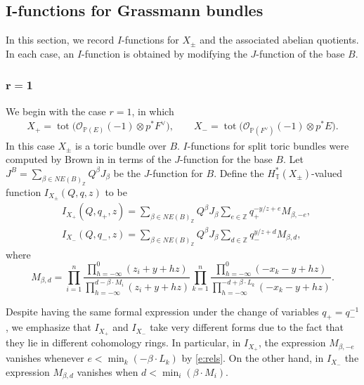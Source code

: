 \documentclass[pdftex]{sigma}
\numberwithin{equation}{section}
\newcommand{\cc}[1]{\mathcal{#1}} %
\newcommand{\ZZ}{\mathbb{Z}}
\newcommand{\PP}{\mathbb{P}}
\newcommand{\torus}{\mathbb{T}}
\DeclareMathOperator{\tot}{tot}
\newcommand{\op}[1]{\operatorname{#1}}
\newcommand{\F}{F}
\newcommand{\E}{E}
\newcommand{\MB}{M}
\newcommand{\LB}{L}
\newcommand{\z}{z}
\newcommand{\x}{x}
\newcommand{\y}{y}
\begin{document}
\subsection[I-functions for Grassmann bundles]{$\boldsymbol{I}$-functions for Grassmann bundles}
In this section, we record $I$-functions for $X_\pm$ and the associated abelian quotients. In each case, an $I$-function is obtained by modifying the $J$-function of the base $B$.

\subsubsection[r=1]{$\boldsymbol{r=1}$}
We begin with the case $r=1$,
in which
\begin{align*}
X_{+} = \tot \bigl( \cc O_{\PP(\E)}(-1) \otimes p^*\F^\vee\bigr),\qquad
X_{-} =\tot \bigl( \cc O_{\PP(\F^\vee)}(-1) \otimes p^*\E\bigr).
\end{align*}
In this case $X_{\pm}$ is a toric bundle over $B$. $I$-functions for split toric bundles were computed by Brown in \cite{Brown} in terms of the $J$-function for the base $B$. Let $J^B = \sum_{\beta \in NE(B)_\ZZ} Q^\beta J_\beta$ be the $J$-function for $B$. Define the $H^*_\torus(X_\pm)$-valued function $I_{X_\pm}(Q, q, z)$ to be
\begin{align*}
&I_{X_+}(Q, q_+, z) =\sum_{\beta \in NE(B)_\ZZ} Q^\beta J_\beta \sum_{e \in \ZZ} q_+^{-\y/z+e} M_{\beta, -e} ,\\
&I_{X_-}(Q, q_-, z) =\sum_{\beta \in NE(B)_\ZZ} Q^\beta J_\beta \sum_{d \in \ZZ} q_-^{\y/z+d} M_{\beta, d},
\end{align*}
where
\begin{equation}\label{hmod} M_{\beta, d} =
\prod_{i=1}^n \frac{\prod_{h=-\infty}^0 (\z_i+\y+hz)}{\prod_{h=-\infty}^{d-\beta\cdot \MB_i} (\z_i+\y+hz)}\prod_{k=1}^{n}\frac{\prod_{h=-\infty}^{0}(-\x_k -\y+hz)}{\prod_{h=-\infty}^{-d+\beta\cdot \LB_k}(-\x_k -\y+hz)}.\end{equation}
\begin{Remark}
Despite having the same formal expression under the change of variables $q_+ = q_-^{-1}$, we emphasize that $I_{X_+}$ and $I_{X_-}$ take very different forms due to the fact that they lie in different cohomology rings. In particular, in $I_{X_+}$, the expression $M_{\beta, -e}$ vanishes whenever $e < \op{min}_k(-\beta\cdot \LB_k)$ by \eqref{e:rels}. On the other hand, in $I_{X_-}$ the expression $M_{\beta, d}$ vanishes when $d < \op{min}_i(\beta\cdot \MB_i)$.

\end{Remark}
\end{document}

